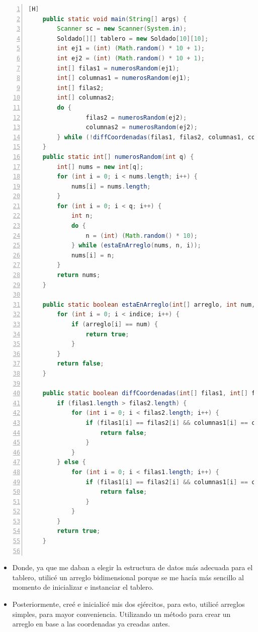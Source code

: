 \documentclass{article}
\begin{document}
	\begin{lstlisting}[language=java,caption={Código parcial}, numbers=left][H]
	public static void main(String[] args) {
        Scanner sc = new Scanner(System.in);
        Soldado[][] tablero = new Soldado[10][10];
        int ej1 = (int) (Math.random() * 10 + 1);
        int ej2 = (int) (Math.random() * 10 + 1);
        int[] filas1 = numerosRandom(ej1);
        int[] columnas1 = numerosRandom(ej1);
        int[] filas2;
        int[] columnas2;
        do {
                filas2 = numerosRandom(ej2);
                columnas2 = numerosRandom(ej2);
        } while (!diffCoordenadas(filas1, filas2, columnas1, columnas2));
    }
    public static int[] numerosRandom(int q) {
        int[] nums = new int[q];
        for (int i = 0; i < nums.length; i++) {
            nums[i] = nums.length;
        }
        for (int i = 0; i < q; i++) {
            int n;
            do {
                n = (int) (Math.random() * 10);
            } while (estaEnArreglo(nums, n, i));
            nums[i] = n;
        }
        return nums;
    }

    public static boolean estaEnArreglo(int[] arreglo, int num, int indice) {
        for (int i = 0; i < indice; i++) {
            if (arreglo[i] == num) {
                return true;
            }
        }
        return false;
    }

    public static boolean diffCoordenadas(int[] filas1, int[] filas2, int[] columnas1, int[] columnas2) {
        if (filas1.length > filas2.length) {
            for (int i = 0; i < filas2.length; i++) {
                if (filas1[i] == filas2[i] && columnas1[i] == columnas2[i]) {
                    return false;
                }
            }
        } else {
            for (int i = 0; i < filas1.length; i++) {
                if (filas1[i] == filas2[i] && columnas1[i] == columnas2[i]) {
                    return false;
                }
            }
        }
        return true;
    }
    
	\end{lstlisting}
	\begin{itemize}	
		\item Donde, ya que me daban a elegir la estructura de datos más adecuada para el tablero, utilicé un arreglo bidimensional porque se me hacía más sencillo al momento de inicializar e instanciar el tablero.
		\item Posteriormente, creé e inicialicé mis dos ejércitos, para esto, utilicé arreglos simples, para mayor conveniencia. Utilizando un método para crear un arreglo en base a las coordenadas ya creadas antes.
	\end{itemize}
\end{document}
